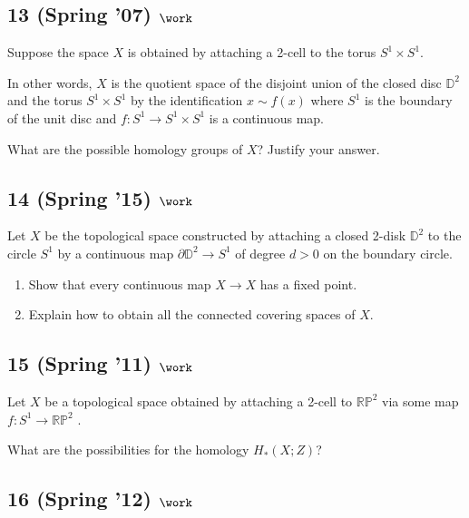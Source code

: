 \hypertarget{spring-07-work-1}{%
\subsection{\texorpdfstring{13 (Spring '07)
\(\work\)}{13 (Spring '07) \textbackslash work}}\label{spring-07-work-1}}

Suppose the space \(X\) is obtained by attaching a 2-cell to the torus
\(S^1 \times S^1\).

In other words, \(X\) is the quotient space of the disjoint union of the
closed disc \({\mathbb{D}}^2\) and the torus \(S^1 \times S^1\) by the
identification \(x \sim f(x)\) where \(S^1\) is the boundary of the unit
disc and \(f : S^1 \to S^1 \times S^1\) is a continuous map.

What are the possible homology groups of \(X\)? Justify your answer.

\hypertarget{spring-15-work-3}{%
\subsection{\texorpdfstring{14 (Spring '15)
\(\work\)}{14 (Spring '15) \textbackslash work}}\label{spring-15-work-3}}

Let \(X\) be the topological space constructed by attaching a closed
2-disk \({\mathbb{D}}^2\) to the circle \(S^1\) by a continuous map
\(\partial{\mathbb{D}}^2 \to S^1\) of degree \(d > 0\) on the boundary
circle.

\begin{enumerate}
\def\labelenumi{\alph{enumi}.}
\item
  Show that every continuous map \(X \to X\) has a fixed point.
\item
  Explain how to obtain all the connected covering spaces of \(X\).
\end{enumerate}

\hypertarget{spring-11-work-2}{%
\subsection{\texorpdfstring{15 (Spring '11)
\(\work\)}{15 (Spring '11) \textbackslash work}}\label{spring-11-work-2}}

Let \(X\) be a topological space obtained by attaching a 2-cell to
\({\mathbb{RP}}^2\) via some map \(f: S^1 \to {\mathbb{RP}}^2\) .

What are the possibilities for the homology \(H_* (X; Z)\)?

\hypertarget{spring-12-work}{%
\subsection{\texorpdfstring{16 (Spring '12)
\(\work\)}{16 (Spring '12) \textbackslash work}}\label{spring-12-work}}


